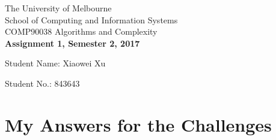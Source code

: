 \documentclass[11pt]{article}
\begin{document}
\begin{center}
{\sc The University of Melbourne
\\
School of Computing and Information Systems
\\ 
COMP90038 Algorithms and Complexity}
\bigskip \\
{\Large\bf Assignment 1, Semester 2, 2017}
\bigskip \\
{Student Name: Xiaowei Xu 

Student No.: 843643}
\end{center}

\section*{My Answers for the Challenges}
\end{document}
